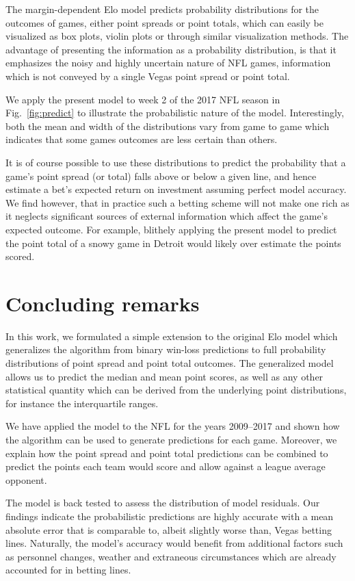 \documentclass[aps,prc,reprint,amsmath,superscriptaddress]{revtex4-1}
\begin{document}
The margin-dependent Elo model predicts probability distributions for the outcomes of games, either point spreads or point totals, which can easily be visualized as box plots, violin plots or through similar visualization methods.
The advantage of presenting the information as a probability distribution, is that it emphasizes the noisy and highly uncertain nature of NFL games, information which is not conveyed by a single Vegas point spread or point total.

We apply the present model to week 2 of the 2017 NFL season in Fig.~\ref{fig:predict} to illustrate the probabilistic nature of the model.
Interestingly, both the mean and width of the distributions vary from game to game which indicates that some games outcomes are less certain than others.

It is of course possible to use these distributions to predict the probability that a game's point spread (or total) falls above or below a given line, and hence estimate a bet's expected return on investment assuming perfect model accuracy.
We find however, that in practice such a betting scheme will not make one rich as it neglects significant sources of external information which affect the game's expected outcome.
For example, blithely applying the present model to predict the point total of a snowy game in Detroit would likely over estimate the points scored.

\section{Concluding remarks}

In this work, we formulated a simple extension to the original Elo model which generalizes the algorithm from binary win-loss predictions to full probability distributions of point spread and point total outcomes.
The generalized model allows us to predict the median and mean point scores, as well as any other statistical quantity which can be derived from the underlying point distributions, for instance the interquartile ranges. 

We have applied the model to the NFL for the years 2009--2017 and shown how the algorithm can be used to generate predictions for each game.
Moreover, we explain how the point spread and point total predictions can be combined to predict the points each team would score and allow against a league average opponent. 

The model is back tested to assess the distribution of model residuals.
Our findings indicate the probabilistic predictions are highly accurate with a mean absolute error that is comparable to, albeit slightly worse than, Vegas betting lines.
Naturally, the model's accuracy would benefit from additional factors such as personnel changes, weather and extraneous circumstances which are already accounted for in betting lines.
\end{document}
